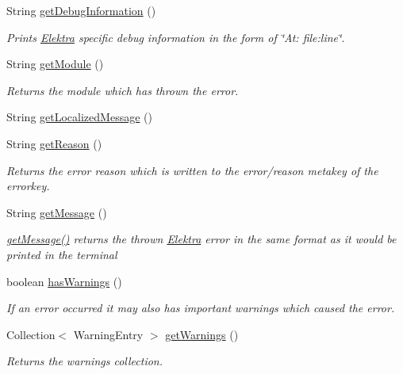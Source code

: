 \begin{DoxyCompactItemize}
String \mbox{\hyperlink{classorg_1_1libelektra_1_1exception_1_1KDBException_ad43f4032095b1bfa1dc5065c5e01f9bb}{get\+Debug\+Information}} ()
\begin{DoxyCompactList}\small\item\em Prints \mbox{\hyperlink{interfaceorg_1_1libelektra_1_1Elektra}{Elektra}} specific debug information in the form of \char`\"{}\+At\+: file\+:line\char`\"{}. \end{DoxyCompactList}\item 
String \mbox{\hyperlink{classorg_1_1libelektra_1_1exception_1_1KDBException_a241bb6bc3b93677bc4b51d23b917f9d1}{get\+Module}} ()
\begin{DoxyCompactList}\small\item\em Returns the module which has thrown the error. \end{DoxyCompactList}\item 
String \mbox{\hyperlink{classorg_1_1libelektra_1_1exception_1_1KDBException_a80c8598787cff127a83290c87450dde0}{get\+Localized\+Message}} ()
\item 
String \mbox{\hyperlink{classorg_1_1libelektra_1_1exception_1_1KDBException_ab3883ac714dca52759f08aaee708cab0}{get\+Reason}} ()
\begin{DoxyCompactList}\small\item\em Returns the error reason which is written to the {\ttfamily error/reason} metakey of the errorkey. \end{DoxyCompactList}\item 
String \mbox{\hyperlink{classorg_1_1libelektra_1_1exception_1_1KDBException_a78bbf7b7767f90840ba6bdb22bebfe11}{get\+Message}} ()
\begin{DoxyCompactList}\small\item\em \mbox{\hyperlink{classorg_1_1libelektra_1_1exception_1_1KDBException_a78bbf7b7767f90840ba6bdb22bebfe11}{get\+Message()}} returns the thrown \mbox{\hyperlink{interfaceorg_1_1libelektra_1_1Elektra}{Elektra}} error in the same format as it would be printed in the terminal \end{DoxyCompactList}\item 
boolean \mbox{\hyperlink{classorg_1_1libelektra_1_1exception_1_1KDBException_a0387189fd5d08448c81a7777f80f8940}{has\+Warnings}} ()
\begin{DoxyCompactList}\small\item\em If an error occurred it may also has important warnings which caused the error. \end{DoxyCompactList}\item 
Collection$<$ Warning\+Entry $>$ \mbox{\hyperlink{classorg_1_1libelektra_1_1exception_1_1KDBException_ae39b71862c220a14f44dff3e5a515239}{get\+Warnings}} ()
\begin{DoxyCompactList}\small\item\em Returns the warnings collection. \end{DoxyCompactList}\end{DoxyCompactItemize}



